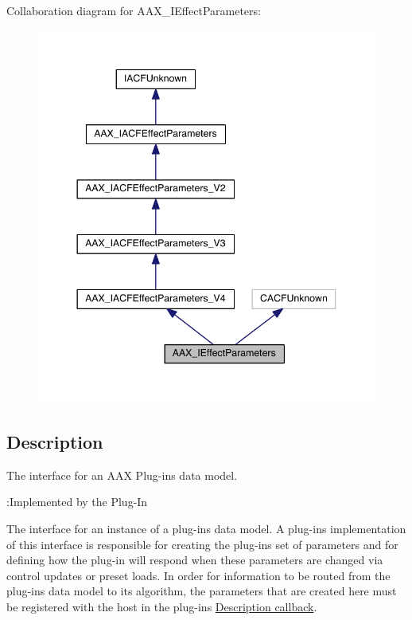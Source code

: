 Collaboration diagram for A\+A\+X\+\_\+\+I\+Effect\+Parameters\+:
\nopagebreak
\begin{figure}[H]
\begin{center}
\leavevmode
\includegraphics[width=344pt]{a00631}
\end{center}
\end{figure}


\subsection{Description}
The interface for an A\+A\+X Plug-\/in\textquotesingle{}s data model. 

\begin{DoxyRefDesc}{\+:\+Implemented by the Plug-\/\+In}
\item[\hyperlink{a00004__aax_plugin_implementation000003}{\+:\+Implemented by the Plug-\/\+In}]\end{DoxyRefDesc}


The interface for an instance of a plug-\/in\textquotesingle{}s data model. A plug-\/in\textquotesingle{}s implementation of this interface is responsible for creating the plug-\/in\textquotesingle{}s set of parameters and for defining how the plug-\/in will respond when these parameters are changed via control updates or preset loads. In order for information to be routed from the plug-\/in\textquotesingle{}s data model to its algorithm, the parameters that are created here must be registered with the host in the plug-\/in\textquotesingle{}s \hyperlink{a00326}{Description callback}.

